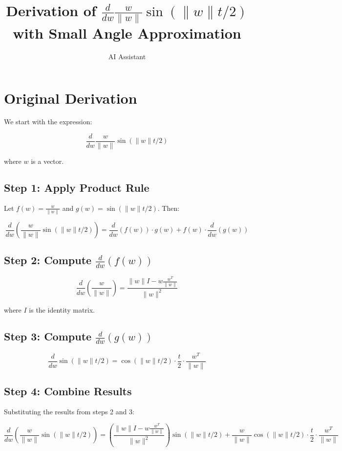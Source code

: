 \documentclass{article}
\title{Derivation of $\frac{d}{dw} \frac{w}{\|w\|} \sin(\|w\| t/2)$ with Small Angle Approximation}
\author{AI Assistant}
\date{}
\begin{document}
\maketitle

\section{Original Derivation}

We start with the expression:

$$\frac{d}{dw} \frac{w}{\|w\|} \sin(\|w\| t/2)$$

where $w$ is a vector.

\subsection{Step 1: Apply Product Rule}

Let $f(w) = \frac{w}{\|w\|}$ and $g(w) = \sin(\|w\| t/2)$. Then:

$$\frac{d}{dw}\left(\frac{w}{\|w\|} \sin(\|w\| t/2)\right) = \frac{d}{dw}(f(w)) \cdot g(w) + f(w) \cdot \frac{d}{dw}(g(w))$$

\subsection{Step 2: Compute $\frac{d}{dw}(f(w))$}

$$\frac{d}{dw}\left(\frac{w}{\|w\|}\right) = \frac{\|w\|I - w\frac{w^T}{\|w\|}}{\|w\|^2}$$

where $I$ is the identity matrix.

\subsection{Step 3: Compute $\frac{d}{dw}(g(w))$}

$$\frac{d}{dw}\sin(\|w\| t/2) = \cos(\|w\| t/2) \cdot \frac{t}{2} \cdot \frac{w^T}{\|w\|}$$

\subsection{Step 4: Combine Results}

Substituting the results from steps 2 and 3:

$$\frac{d}{dw}\left(\frac{w}{\|w\|} \sin(\|w\| t/2)\right) = \left(\frac{\|w\|I - w\frac{w^T}{\|w\|}}{\|w\|^2}\right) \sin(\|w\| t/2) + \frac{w}{\|w\|} \cos(\|w\| t/2) \cdot \frac{t}{2} \cdot \frac{w^T}{\|w\|}$$
\end{document}
